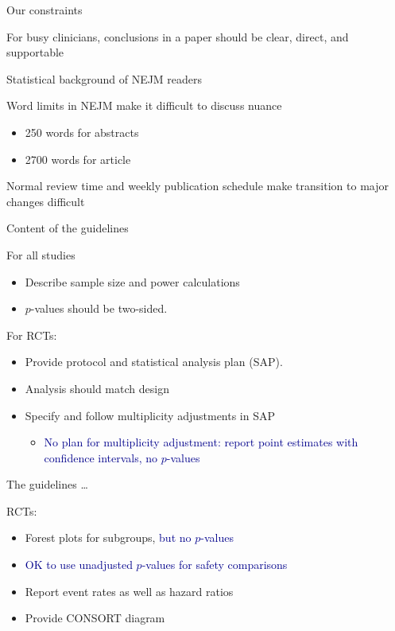 \documentclass[ignorenonframetext,]{beamer}
\providecommand{\tightlist}{%
  \setlength{\itemsep}{0pt}\setlength{\parskip}{0pt}}
\begin{document}
\begin{frame}{Our constraints}
\protect\hypertarget{our-constraints}{}

For busy clinicians, conclusions in a paper should be clear, direct, and
supportable

Statistical background of NEJM readers

Word limits in NEJM make it difficult to discuss nuance

\begin{itemize}
\item
  250 words for abstracts
\item
  2700 words for article
\end{itemize}

Normal review time and weekly publication schedule make transition to
major changes difficult

\end{frame}

\begin{frame}{Content of the guidelines}
\protect\hypertarget{content-of-the-guidelines}{}

For all studies

\begin{itemize}
\item
  Describe sample size and power calculations
\item
  \(p\)-values should be two-sided.
\end{itemize}

For RCTs:

\begin{itemize}
\item
  Provide protocol and statistical analysis plan (SAP).
\item
  Analysis should match design
\item
  Specify and follow multiplicity adjustments in SAP

  \begin{itemize}
  \tightlist
  \item
    \textcolor{darkblue}{No plan for multiplicity adjustment: report point estimates with confidence intervals, no $p$-values}
  \end{itemize}
\end{itemize}

\end{frame}

\begin{frame}{The guidelines \ldots}
\protect\hypertarget{the-guidelines}{}

RCTs:

\begin{itemize}
\item
  Forest plots for subgroups, \textcolor{darkblue}{but no $p$-values}
\item
  \textcolor{darkblue}{OK to use unadjusted $p$-values for safety comparisons}
\item
  Report event rates as well as hazard ratios
\item
  Provide CONSORT diagram
\end{itemize}

\end{frame}
\end{document}
